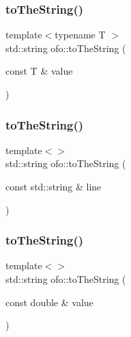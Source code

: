 \mbox{\label{namespaceofo_a2c6e4d8296036cbf1f27a0e785d203e1}} 
\subsubsection{\texorpdfstring{to\+The\+String()}{toTheString()}\hspace{0.1cm}{\footnotesize\ttfamily [2/4]}}
{\footnotesize\ttfamily template$<$typename T $>$ \\
std\+::string ofo\+::to\+The\+String (\begin{DoxyParamCaption}\item[{const T \&}]{value }\end{DoxyParamCaption})}

\mbox{\label{namespaceofo_ac9cdba42766a85130c57eb07fd5bd5e5}} 
\subsubsection{\texorpdfstring{to\+The\+String()}{toTheString()}\hspace{0.1cm}{\footnotesize\ttfamily [3/4]}}
{\footnotesize\ttfamily template$<$$>$ \\
std\+::string ofo\+::to\+The\+String (\begin{DoxyParamCaption}\item[{const std\+::string \&}]{line }\end{DoxyParamCaption})}

\mbox{\label{namespaceofo_a7afe8b17c1060a8756bff591f3a6e163}} 
\subsubsection{\texorpdfstring{to\+The\+String()}{toTheString()}\hspace{0.1cm}{\footnotesize\ttfamily [4/4]}}
{\footnotesize\ttfamily template$<$$>$ \\
std\+::string ofo\+::to\+The\+String (\begin{DoxyParamCaption}\item[{const double \&}]{value }\end{DoxyParamCaption})}


